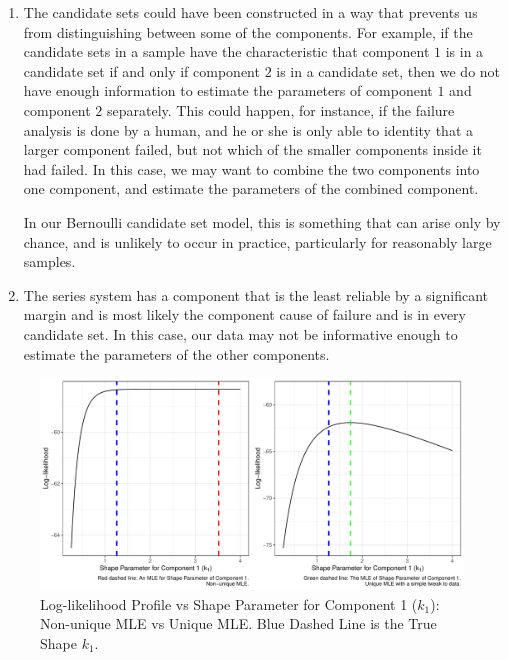 \documentclass[
]{article}
\begin{document}
\begin{enumerate}
\def\labelenumi{\arabic{enumi}.}
\item
  The candidate sets could have been constructed in a way that prevents
  us from distinguishing between some of the components. For example, if
  the candidate sets in a sample have the characteristic that component
  \(1\) is in a candidate set if and only if component \(2\) is in a
  candidate set, then we do not have enough information to estimate the
  parameters of component \(1\) and component \(2\) separately. This
  could happen, for instance, if the failure analysis is done by a
  human, and he or she is only able to identity that a larger component
  failed, but not which of the smaller components inside it had failed.
  In this case, we may want to combine the two components into one
  component, and estimate the parameters of the combined component.

  In our Bernoulli candidate set model, this is something that can arise
  only by chance, and is unlikely to occur in practice, particularly for
  reasonably large samples.
\item
  The series system has a component that is the least reliable by a
  significant margin and is most likely the component cause of failure
  and is in every candidate set. In this case, our data may not be
  informative enough to estimate the parameters of the other components.
\end{enumerate}

\begin{figure}

{\centering \includegraphics{image/test-flat-likelihood} 

}

\caption{Log-likelihood Profile vs Shape Parameter for Component 1 ($k_1$): Non-unique MLE vs Unique MLE.
Blue Dashed Line is the True Shape $k_1$.}\label{fig:flat-loglike-prof}
\end{figure}
\end{document}
